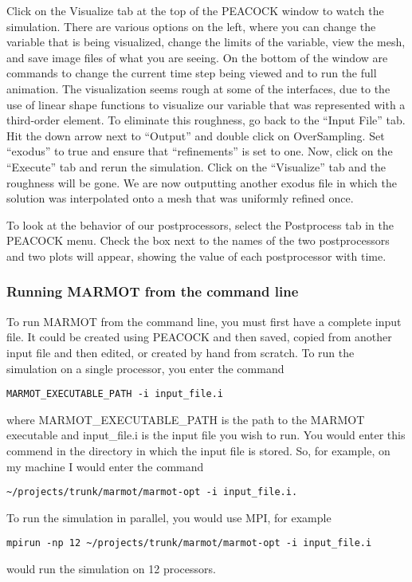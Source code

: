 \documentclass[letter,12pt,fleqn]{article}
\begin{document}
Click on the Visualize tab at the top of the PEACOCK window to watch the simulation. There are various options on the left, where you can change the variable that is being visualized, change the limits of the variable, view the mesh, and save image files of what you are seeing. On the bottom of the window are commands to change the current time step being viewed and to run the full animation. The visualization seems rough at some of the interfaces, due to the use of linear shape functions to visualize our variable that was represented with a third-order element. To eliminate this roughness, go back to the ``Input File'' tab. Hit the down arrow next to ``Output'' and double click on OverSampling. Set ``exodus'' to true and ensure that ``refinements'' is set to one. Now, click on the ``Execute'' tab and rerun the simulation. Click on the ``Visualize'' tab and the roughness will be gone. We are now outputting another exodus file in which the solution was interpolated onto a mesh that was uniformly refined once.

To look at the behavior of our postprocessors, select the Postprocess tab in the PEACOCK menu. Check the box next to the names of the two postprocessors and two plots will appear, showing the value of each postprocessor with time. 

\subsubsection{Running MARMOT from the command line}
To run MARMOT from the command line, you must first have a complete input file. It could be created using PEACOCK and then saved, copied from another input file and then edited, or created by hand from scratch. To run the simulation on a single processor, you enter the command
\begin{verbatim}
MARMOT_EXECUTABLE_PATH -i input_file.i
\end{verbatim}
where MARMOT\_EXECUTABLE\_PATH is the path to the MARMOT executable and input\_file.i is the input file you wish to run. You would enter this commend in the directory in which the input file is stored. So, for example, on my machine I would enter the command
\begin{verbatim}
~/projects/trunk/marmot/marmot-opt -i input_file.i.
\end{verbatim}
To run the simulation in parallel, you would use MPI, for example
\begin{verbatim}
mpirun -np 12 ~/projects/trunk/marmot/marmot-opt -i input_file.i
\end{verbatim}
would run the simulation on 12 processors. 
\end{document}
